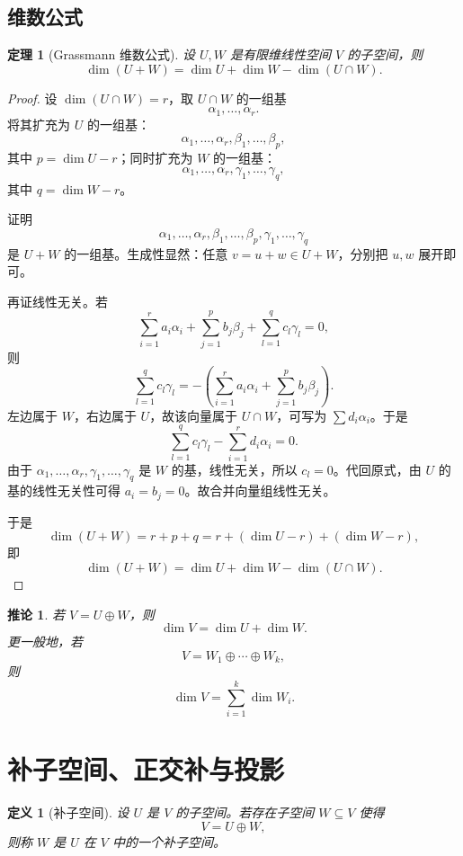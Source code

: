 \documentclass[UTF8,openany,zihao=-4]{ctexbook}
\theoremstyle{cnplain}
\newtheorem{definition}{定义}[chapter]
\newtheorem{theorem}{定理}[chapter]
\newtheorem{corollary}{推论}[chapter]
\begin{document}
\subsection{维数公式}

\begin{theorem}[Grassmann 维数公式]
设 $U,W$ 是有限维线性空间 $V$ 的子空间，则
\[
\dim(U+W)=\dim U+\dim W-\dim(U\cap W).
\]
\end{theorem}

\begin{proof}
设 $\dim(U\cap W)=r$，取 $U\cap W$ 的一组基
\[
\alpha_1,
\ldots,\alpha_r.
\]
将其扩充为 $U$ 的一组基：
\[
\alpha_1,
\ldots,\alpha_r,
\beta_1,
\ldots,\beta_p,
\]
其中 $p=\dim U-r$；同时扩充为 $W$ 的一组基：
\[
\alpha_1,
\ldots,\alpha_r,
\gamma_1,
\ldots,\gamma_q,
\]
其中 $q=\dim W-r$。

证明
\[
\alpha_1,
\ldots,\alpha_r,
\beta_1,
\ldots,\beta_p,
\gamma_1,
\ldots,\gamma_q
\]
是 $U+W$ 的一组基。生成性显然：任意 $v=u+w\in U+W$，分别把 $u,w$ 展开即可。

再证线性无关。若
\[
\sum_{i=1}^r a_i\alpha_i+
\sum_{j=1}^p b_j\beta_j+
\sum_{l=1}^q c_l\gamma_l=0,
\]
则
\[
\sum_{l=1}^q c_l\gamma_l
=-\left(\sum_{i=1}^r a_i\alpha_i+
\sum_{j=1}^p b_j\beta_j\right).
\]
左边属于 $W$，右边属于 $U$，故该向量属于 $U\cap W$，可写为 $\sum d_i\alpha_i$。于是
\[
\sum_{l=1}^q c_l\gamma_l-
\sum_{i=1}^r d_i\alpha_i=0.
\]
由于 $\alpha_1,
\ldots,\alpha_r,
\gamma_1,
\ldots,\gamma_q$ 是 $W$ 的基，线性无关，所以 $c_l=0$。代回原式，由 $U$ 的基的线性无关性可得 $a_i=b_j=0$。故合并向量组线性无关。

于是
\[
\dim(U+W)=r+p+q
=r+(\dim U-r)+(\dim W-r),
\]
即
\[
\dim(U+W)=\dim U+\dim W-\dim(U\cap W).
\]
\end{proof}

\begin{corollary}
若 $V=U\oplus W$，则
\[
\dim V=\dim U+\dim W.
\]
更一般地，若
\[
V=W_1\oplus\cdots\oplus W_k,
\]
则
\[
\dim V=\sum_{i=1}^k\dim W_i.
\]
\end{corollary}

\section{补子空间、正交补与投影}

\begin{definition}[补子空间]
设 $U$ 是 $V$ 的子空间。若存在子空间 $W\subseteq V$ 使得
\[
V=U\oplus W,
\]
则称 $W$ 是 $U$ 在 $V$ 中的一个补子空间。
\end{definition}
\end{document}

